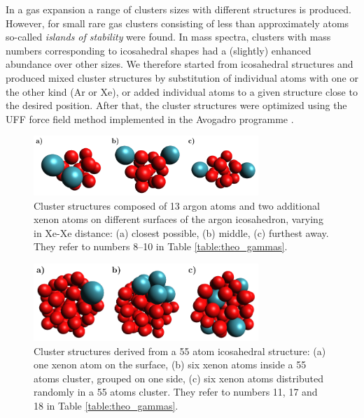 In a gas expansion a range of clusters sizes with different structures is produced. 
However, for small rare gas clusters consisting of less than approximately \unit[1000]{atoms} so-called \emph{islands of stability} were found.\cite{haberland}  
In mass spectra, clusters with mass numbers corresponding to icosahedral shapes had a (slightly) enhanced abundance over other sizes. 
We therefore started from icosahedral structures and produced mixed cluster structures by substitution of individual atoms with one or the other kind (Ar or Xe), or added individual atoms to a given structure close to the desired position. 
After that, the cluster structures were optimized using the UFF force field method \cite{} implemented in the 
Avogadro programme \cite{}.
%
\begin{figure}[ht]
 \centering
 \includegraphics[width=8.5cm]{pics/cluster_2_overview.pdf}
 \caption{Cluster structures composed of 13 argon atoms and two additional xenon
          atoms on different surfaces of the argon icosahedron, varying in Xe-Xe distance:
          (a) closest possible, (b) middle, (c) furthest away. They refer to
          numbers 8--10 in Table \ref{table:theo_gammas}.}
 \label{figure:cluster_2_overview}
\end{figure}
%
\begin{figure}[h]
 \centering
 \includegraphics[width=8.5cm]{pics/cluster_3_overview.pdf}
 \caption{Cluster structures derived from a 55 atom icosahedral structure:
          (a) one xenon atom on the surface, (b) six xenon atoms inside a 55 atoms cluster,
          grouped on one side, (c) six xenon atoms distributed randomly
          in a 55 atoms cluster. They refer to numbers 11, 17 and 18
          in Table \ref{table:theo_gammas}.}
 \label{figure:cluster_3_overview}
\end{figure}

